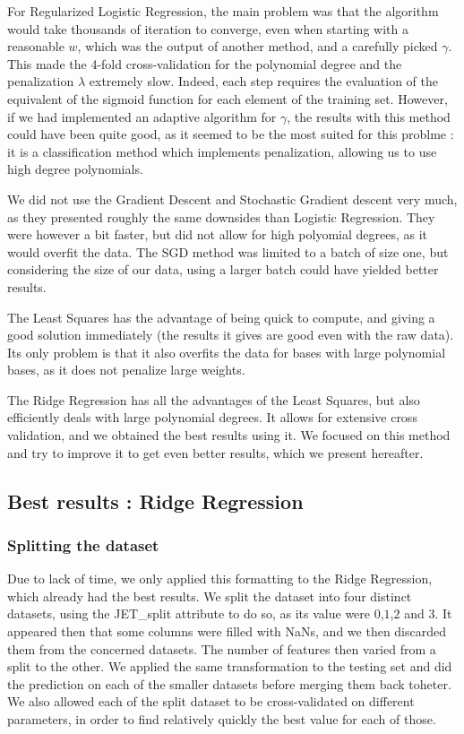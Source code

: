 \documentclass[10pt,conference,compsocconf]{IEEEtran}
\begin{document}
For Regularized Logistic Regression, the main problem was that the algorithm would take thousands of iteration to converge, even when starting with a reasonable $w$, which was the output of another method, and a carefully picked $\gamma$. This made the 4-fold cross-validation for the polynomial degree and the penalization $\lambda$ extremely slow. Indeed, each step requires the evaluation of the equivalent of the sigmoid function for each element of the training set. However, if we had implemented an adaptive algorithm for $\gamma$, the results with this method could have been quite good, as it seemed to be the most suited for this problme : it is a classification method which implements penalization, allowing us to use high degree polynomials.

We did not use the Gradient Descent and Stochastic Gradient descent very much, as they presented roughly the same downsides than Logistic Regression. They were however a bit faster, but did not allow for high polyomial degrees, as it would overfit the data. The SGD method was limited to a batch of size one, but considering the size of our data, using a larger batch could have yielded better results.

The Least Squares has the advantage of being quick to compute, and giving a good solution immediately (the results it gives are good even with the raw data). Its only problem is that it also overfits the data for bases with large polynomial bases, as it does not penalize large weights.

The Ridge Regression has all the advantages of the Least Squares, but also efficiently deals with large polynomial degrees. It allows for extensive cross validation, and we obtained the best results using it. We focused on this method and try to improve it to get even better results, which we present hereafter.


\subsection{Best results : Ridge Regression}
\subsubsection{Splitting the dataset}
Due to lack of time, we only applied this formatting to the Ridge Regression, which already had the best results. We split the dataset into four distinct datasets, using the JET\_split attribute to do so, as its value were $0$,$1$,$2$ and $3$. It appeared then that some columns were filled with NaNs, and we then discarded them from the concerned datasets. The number of features then varied from a split to the other. We applied the same transformation to the testing set and did the prediction on each of the smaller datasets before merging them back toheter. We also allowed each of the split dataset to be cross-validated on different parameters, in order to find relatively quickly the best value for each of those.
\end{document}
